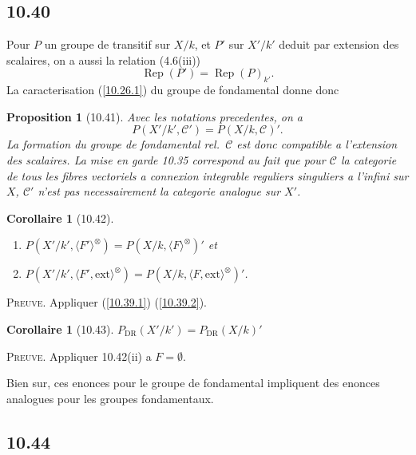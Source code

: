 \documentclass[12pt,a4paper]{article}
\theoremstyle{plain}
\newtheorem{proposition}[theorem]{Proposition}
\newtheorem{corollary}[theorem]{Corollaire}
\theoremstyle{definition}
\theoremstyle{remark}
\DeclareMathOperator{\Rep}{Rep}
\newcommand{\DR}{\mathrm{DR}}
\newcommand{\ext}{\mathrm{ext}}
\begin{document}
\subsection*{10.40}

Pour $P$ un groupe de transitif sur $X/k$, et $P'$ sur $X'/k'$ deduit par extension des scalaires, on a aussi la relation (4.6(iii))
$$\Rep(P') = \Rep(P)_{k'}.$$
La caracterisation (\ref{10.26.1}) du groupe de fondamental donne donc
\begin{proposition}[10.41]
Avec les notations precedentes, on a
$$P(X'/k', \mathcal{C}') = P(X/k, \mathcal{C})'.$$
La formation du groupe de fondamental rel.~$\mathcal{C}$ est donc compatible a l'extension des scalaires. La mise en garde 10.35 correspond au fait que pour $\mathcal{C}$ la categorie de tous les fibres vectoriels a connexion integrable reguliers singuliers a l'infini sur $X$, $\mathcal{C}'$ n'est pas necessairement la categorie analogue sur $X'$.
\end{proposition}

\begin{corollary}[10.42]
\leavevmode
\begin{enumerate}[label=(\roman*)]
\item $P(X'/k', \langle F' \rangle^{\otimes}) = P(X/k, \langle F \rangle^{\otimes})'$ et
\item $P(X'/k', \langle F', \ext \rangle^{\otimes}) = P(X/k, \langle F, \ext \rangle^{\otimes})'$.
\end{enumerate}
\end{corollary}

\textsc{Preuve.} Appliquer (\ref{10.39.1}) (\ref{10.39.2}).

\begin{corollary}[10.43]
$P_{\DR}(X'/k') = P_{\DR}(X/k)'$
\end{corollary}

\textsc{Preuve.} Appliquer 10.42(ii) a $F = \emptyset$.

Bien sur, ces enonces pour le groupe de fondamental impliquent des enonces analogues pour les groupes fondamentaux.

\subsection*{10.44}
\end{document}
